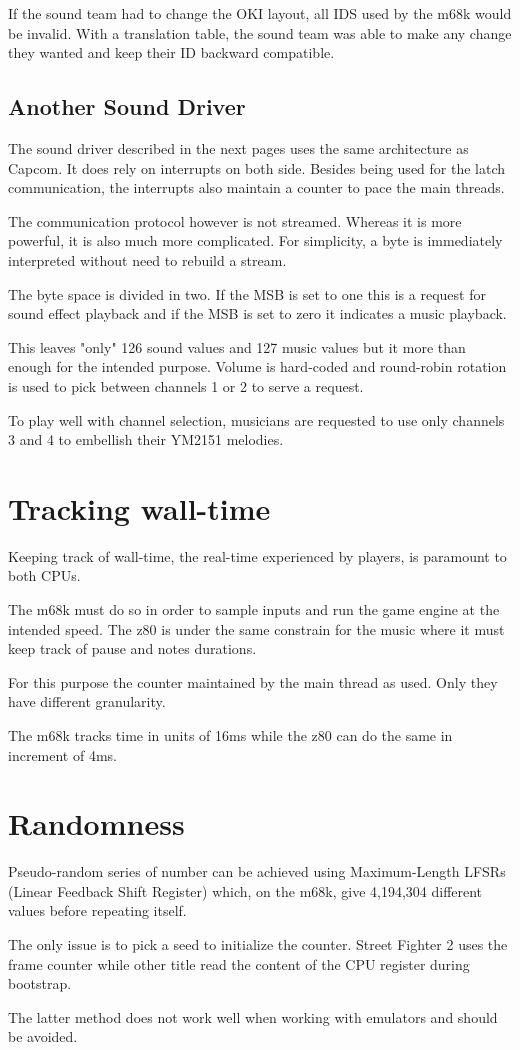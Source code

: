 If the sound team had to change the OKI layout, all IDS used by the m68k would be invalid. With a translation table, the sound team was able to make any change they wanted and keep their ID backward compatible.


\subsection{Another Sound Driver}

The sound driver described in the next pages uses the same architecture as Capcom. It does rely on interrupts on both side. Besides being used for the latch communication, the interrupts also maintain a counter to pace the main threads.


The communication protocol however is not streamed. Whereas it is more powerful, it is also much more complicated. For simplicity, a byte is immediately interpreted without need to rebuild a stream.

The byte space is divided in two. If the MSB is set to one  this is a request for sound effect playback and if the MSB is set to zero  it indicates a music playback. 

This leaves "only" 126 sound values and 127 music values but it more than enough for the intended purpose. Volume is hard-coded and round-robin rotation is used to pick between channels 1 or 2 to serve a request. 

To play well with channel selection, musicians are requested to use only channels 3 and 4 to embellish their YM2151 melodies. 


\section{Tracking wall-time}
Keeping track of wall-time, the real-time experienced by players, is paramount to both CPUs. 

The m68k must do so in order to sample inputs and run the game engine at the intended speed. The z80 is under the same constrain for the music where it must keep track of pause and notes durations. 

For this purpose the counter maintained by the main thread as used. Only they have different granularity.

The m68k tracks time in units of 16ms while the z80 can do the same in increment of 4ms.


\section{Randomness}
Pseudo-random series of number can be achieved using Maximum-Length LFSRs (Linear Feedback Shift Register) which, on the m68k, give 4,194,304 different values before repeating itself.

The only issue is to pick a seed to initialize the counter. Street Fighter 2 uses the frame counter while other title read the content of the CPU register during bootstrap.

The latter method does not work well when working with emulators and should be avoided.
